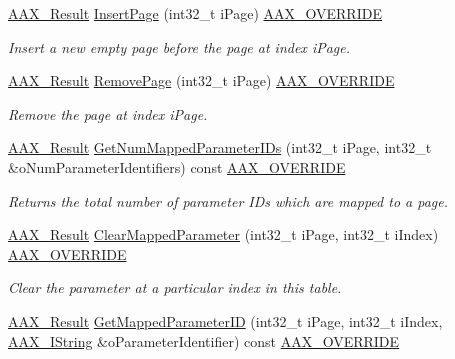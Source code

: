 \begin{DoxyCompactItemize}
\mbox{\hyperlink{a00392_a4d8f69a697df7f70c3a8e9b8ee130d2f}{A\+A\+X\+\_\+\+Result}} \mbox{\hyperlink{a01929_a65d873c58f26c3e01db0d585e15eac36}{Insert\+Page}} (int32\+\_\+t i\+Page) \mbox{\hyperlink{a00392_ac2f24a5172689ae684344abdcce55463}{A\+A\+X\+\_\+\+O\+V\+E\+R\+R\+I\+DE}}
\begin{DoxyCompactList}\small\item\em Insert a new empty page before the page at index {\ttfamily i\+Page}. \end{DoxyCompactList}\item 
\mbox{\hyperlink{a00392_a4d8f69a697df7f70c3a8e9b8ee130d2f}{A\+A\+X\+\_\+\+Result}} \mbox{\hyperlink{a01929_a15c5b3080afec26837256639525b435b}{Remove\+Page}} (int32\+\_\+t i\+Page) \mbox{\hyperlink{a00392_ac2f24a5172689ae684344abdcce55463}{A\+A\+X\+\_\+\+O\+V\+E\+R\+R\+I\+DE}}
\begin{DoxyCompactList}\small\item\em Remove the page at index {\ttfamily i\+Page}. \end{DoxyCompactList}\item 
\mbox{\hyperlink{a00392_a4d8f69a697df7f70c3a8e9b8ee130d2f}{A\+A\+X\+\_\+\+Result}} \mbox{\hyperlink{a01929_a0fd89bed544e1688aa64644893f2865b}{Get\+Num\+Mapped\+Parameter\+I\+Ds}} (int32\+\_\+t i\+Page, int32\+\_\+t \&o\+Num\+Parameter\+Identifiers) const \mbox{\hyperlink{a00392_ac2f24a5172689ae684344abdcce55463}{A\+A\+X\+\_\+\+O\+V\+E\+R\+R\+I\+DE}}
\begin{DoxyCompactList}\small\item\em Returns the total number of parameter I\+Ds which are mapped to a page. \end{DoxyCompactList}\item 
\mbox{\hyperlink{a00392_a4d8f69a697df7f70c3a8e9b8ee130d2f}{A\+A\+X\+\_\+\+Result}} \mbox{\hyperlink{a01929_a73e8e14edd0498206edad2a712f92abc}{Clear\+Mapped\+Parameter}} (int32\+\_\+t i\+Page, int32\+\_\+t i\+Index) \mbox{\hyperlink{a00392_ac2f24a5172689ae684344abdcce55463}{A\+A\+X\+\_\+\+O\+V\+E\+R\+R\+I\+DE}}
\begin{DoxyCompactList}\small\item\em Clear the parameter at a particular index in this table. \end{DoxyCompactList}\item 
\mbox{\hyperlink{a00392_a4d8f69a697df7f70c3a8e9b8ee130d2f}{A\+A\+X\+\_\+\+Result}} \mbox{\hyperlink{a01929_ac789a37d76fb2f466d9dbcb93cb7a134}{Get\+Mapped\+Parameter\+ID}} (int32\+\_\+t i\+Page, int32\+\_\+t i\+Index, \mbox{\hyperlink{a01873}{A\+A\+X\+\_\+\+I\+String}} \&o\+Parameter\+Identifier) const \mbox{\hyperlink{a00392_ac2f24a5172689ae684344abdcce55463}{A\+A\+X\+\_\+\+O\+V\+E\+R\+R\+I\+DE}}

\end{DoxyCompactItemize}
